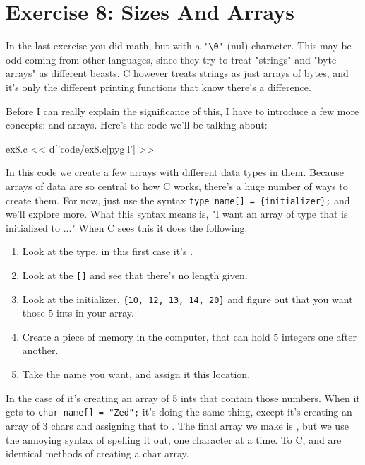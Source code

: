 \chapter{Exercise 8: Sizes And Arrays}

In the last exercise you did math, but with a \verb|'\0'| (nul) character.
This may be odd coming from other languages, since they try to treat
"strings" and "byte arrays" as different beasts.  C however treats strings
as just arrays of bytes, and it's only the different printing functions
that know there's a difference.

Before I can really explain the significance of this, I have to
introduce a few more concepts:  and arrays.  Here's
the code we'll be talking about:

\begin{code}{ex8.c}
<< d['code/ex8.c|pyg|l'] >>
\end{code}

In this code we create a few arrays with different data types in them.  Because
arrays of data are so central to how C works, there's a huge number of ways to
create them.  For now, just use the syntax \verb|type name[] = {initializer};|
and we'll explore more.  What this syntax means is, "I want an array of
type that is initialized to {..}."  When C sees this it does the following:

\begin{enumerate}
\item Look at the type, in this first case it's .
\item Look at the \verb|[]| and see that there's no length given.
\item Look at the initializer, \verb|{10, 12, 13, 14, 20}| and 
    figure out that you want those 5 ints in your array.
\item Create a piece of memory in the computer, that can hold 
    5 integers one after another.
\item Take the name you want,  and assign it this
    location.
\end{enumerate}

In the case of  it's creating an array of 5 ints
that contain those numbers.  When it gets to \verb|char name[] = "Zed";|
it's doing the same thing, except it's creating an array of 3 chars and
assigning that to .  The final array we make is ,
but we use the annoying syntax of spelling it out, one character at a time.
To C,  and  are identical methods of creating 
a char array.

